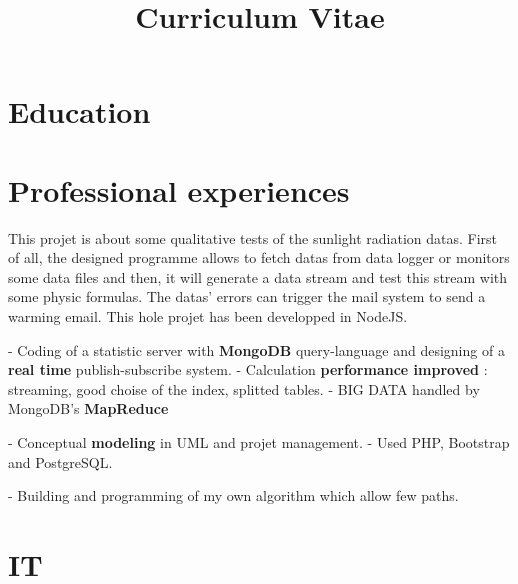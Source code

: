 \documentclass[11pt,a4paper]{moderncv}
\title{Curriculum Vitae}
\begin{document}
\maketitle

\section{Education}


\section{Professional experiences}

{
This projet is about some qualitative tests of the sunlight radiation datas. First of all, the designed programme allows to fetch datas from data logger or monitors some data files and then, it will generate a data stream and test this stream with some physic formulas. The datas' errors can trigger the mail system to send a warming email. This hole projet has been developped in NodeJS.
}

{
- Coding of a statistic server with \textbf{MongoDB} query-language and designing of a \textbf{real time} publish-subscribe system.\newline
- Calculation \textbf{performance improved} : streaming, good choise of the index, splitted tables.\newline
- BIG DATA handled by MongoDB's \textbf{MapReduce}
}

{
- Conceptual \textbf{modeling} in UML and projet management.\newline
- Used PHP, Bootstrap and PostgreSQL.
}

{
- Building and programming of my own algorithm which allow few paths.
}

\section{IT}
\end{document}

